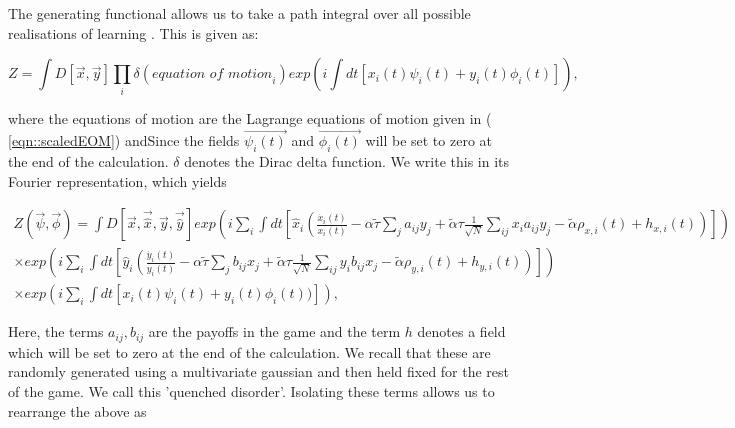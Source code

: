 \documentclass[.../main.tex]{subfiles}
\begin{document}
	The generating functional allows us to take a path integral over all possible realisations of
	learning \cite{SpinGlassTheory}. This is given as:

	\begin{equation}
		Z = \int D[\Vec{x}, \Vec{y}] \prod_i \delta(\textit{equation of motion}_i) exp(i
		\int dt[x_i(t) \psi_i(t) + y_i(t) \phi_i(t)]), 
	\end{equation}

	where the equations of motion are the Lagrange equations of motion given in (
	\ref{eqn::scaledEOM}) andSince
	the fields $\Vec{\psi_i(t)}$ and $\Vec{\phi_i(t)}$ will be set to zero at the end of the
	calculation. $\delta$ denotes the Dirac delta function. We write this in its Fourier
	representation, which yields	

	\begin{equation}
		\begin{split}
	\label{eqn::generatingfunctional}
		Z(\Vec{\psi}, \Vec{\phi}) = \int D[\Vec{x}, \Vec{\hat{x}}, \Vec{y}, \Vec{\hat{y}}] exp(i \sum_i \int dt[\hat{x}_i
		(\frac{\dot{x_i}(t)}{x_i(t)} - \alpha \tilde{\tau} \sum_{j} a_
			{ij} 
			y_j +
			\tilde{\alpha} \tau \frac{1}{\sqrt{N}} \sum_{i j} x_i a_{ij} y_j
			- \tilde{\alpha} \rho_{x, i}(t) + h_{x, i}(t))]) 
			\\
			\times exp(i \sum_i \int dt[\hat{y}_i
		(\frac{\dot{y_i}(t)}{y_i(t)} - \alpha \tilde{\tau} \sum_{j} b_
			{ij} 
			x_j +
			\tilde{\alpha} \tau \frac{1}{\sqrt{N}} \sum_{i j} y_i b_{ij} x_j
			- \tilde{\alpha} \rho_{y, i}(t)+ h_{y, i}(t))])\\
			\times exp(i \sum_i
		\int dt[x_i(t) \psi_i(t) + y_i(t) \phi_i(t))]),
	\end{split}
	\end{equation}

	Here, the terms $a_{ij}, b_{ij}$ are the payoffs in the game and the term $h$ denotes a field
	which will be set to zero at the end of the calculation. We recall that these are randomly
	generated using a multivariate gaussian and then held fixed for the rest of the game. We call
	this 'quenched disorder'. Isolating these terms allows us to rearrange the above as
\end{document}
